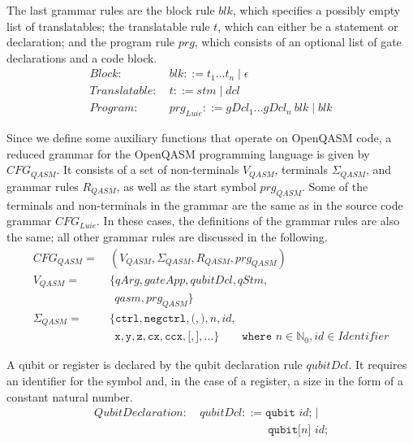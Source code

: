 The last grammar rules are the block rule $blk$, which specifies a possibly empty list of translatables; the translatable rule $t$, which can either be a statement or declaration; and the program rule $prg$, which consists of an optional list of gate declarations and a code block.
\begin{align*}
    Block: \ & blk::= t_1 \dots t_n \mid \epsilon\\
    Translatable : \ & t::= stm \mid dcl\\
    Program: \ & prg_{Luie} ::= gDcl_1 \dots gDcl_n \ blk \mid blk 
\end{align*}

Since we define some auxiliary functions that operate on OpenQASM code, a reduced grammar for the OpenQASM programming language is given by $CFG_{QASM}$. It consists of a set of non-terminals $V_{QASM}$, terminals $\Sigma_{QASM}$, and grammar rules $R_{QASM}$, as well as the start symbol $prg_{QASM}$. Some of the terminals and non-terminals in the grammar are the same as in the source code grammar $CFG_{Luie}$. In these cases, the definitions of the grammar rules are also the same; all other grammar rules are discussed in the following.
\begin{align*}
    CFG_{QASM} = \ & (V_{QASM}, \Sigma_{QASM}, R_{QASM}, prg_{QASM} )\\ 
    V_{QASM} = \ & \{ qArg, gateApp, qubitDcl, qStm,\\ 
            & \ \  qasm, prg_{QASM}\}\\ 
    \Sigma_{QASM} = \ & \{\texttt{ctrl}, \texttt{negctrl}, \texttt{(}, \texttt{)}, n, id,  \\
               & \ \ \texttt{x}, \texttt{y}, \texttt{z}, \texttt{cx}, \texttt{ccx}, \texttt{[}, \texttt{]}, \dots \}  
               \quad \quad \texttt{where } n \in \mathbb{N}_0, id \in Identifier
\end{align*}

A qubit or register is declared by the qubit declaration rule $qubitDcl$. It requires an identifier for the symbol and, in the case of a register, a size in the form of a constant natural number. 
\begin{align*}
    QubitDeclaration: \ & qubitDcl::= \texttt{qubit } id \texttt{;} \mid\\
    & \hspace{6em} \texttt{qubit[}n\texttt{] } id \texttt{;}
\end{align*}

